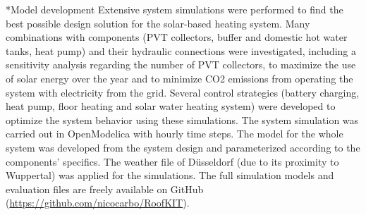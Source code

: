 \documentclass[twocolumn, a4paper,10pt]{article}
\makeatletter
\renewcommand\section{\@startsection{section}{1}{\z@}{3pt}{3pt}{\normalfont\large\bfseries}}
\makeatother
\begin{document}
\section*{Model development}
Extensive system simulations were performed to find the best possible design solution for the solar-based heating system. Many combinations with components (PVT collectors, buffer and domestic hot water tanks, heat pump) and their hydraulic connections were investigated, including a sensitivity analysis regarding the number of PVT collectors, to maximize the use of solar energy over the year and to minimize CO2 emissions from operating the system with electricity from the grid. Several control strategies (battery charging, heat pump, floor heating and solar water heating system) were developed to optimize the system behavior using these simulations. The system simulation was carried out in OpenModelica \citet{Fritzson2006} with hourly time steps. The model for the whole system was developed from the system design and parameterized according to the components' specifics. The weather file of Düsseldorf (due to its proximity to Wuppertal) was applied for the simulations. The full simulation models and evaluation files are freely available on GitHub (\textcolor{blue}{\url{https://github.com/nicocarbo/RoofKIT}}).\\

\end{document}
